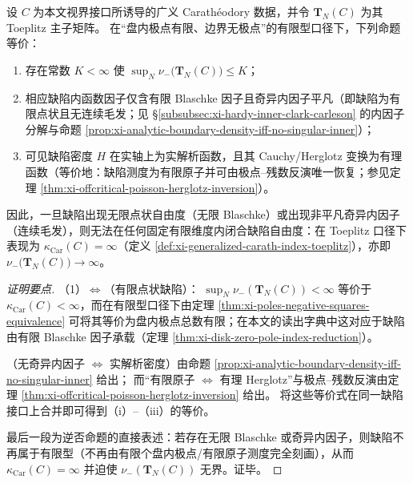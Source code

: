 \begin{corollary}\label{cor:xi-discrete-vs-continuous-hair-by-negative-inertia}
设 \(C\) 为本文视界接口所诱导的广义 Carath\'eodory 数据，并令 \(\mathbf{T}_N(C)\) 为其 Toeplitz 主子矩阵。
在“盘内极点有限、边界无极点”的有限型口径下，下列命题等价：
\begin{enumerate}
  \item 存在常数 \(K<\infty\) 使
  \(\sup_{N}\nu_-\!\bigl(\mathbf{T}_N(C)\bigr)\le K\)；
  \item 相应缺陷内函数因子仅含有限 Blaschke 因子且奇异内因子平凡（即缺陷为有限点状且无连续毛发；见 \S\ref{subsubsec:xi-hardy-inner-clark-carleson} 的内因子分解与命题 \ref{prop:xi-analytic-boundary-density-iff-no-singular-inner}）；
  \item 可见缺陷密度 \(H\) 在实轴上为实解析函数，且其 Cauchy/Herglotz 变换为有理函数（等价地：缺陷测度为有限原子并可由极点--残数反演唯一恢复；参见定理 \ref{thm:xi-offcritical-poisson-herglotz-inversion}）。
\end{enumerate}
因此，一旦缺陷出现无限点状自由度（无限 Blaschke）或出现非平凡奇异内因子（连续毛发），则无法在任何固定有限维度内闭合缺陷自由度：在 Toeplitz 口径下表现为 \(\kappa_{\mathrm{Car}}(C)=\infty\)（定义 \ref{def:xi-generalized-carath-index-toeplitz}），亦即 \(\nu_-\!\bigl(\mathbf{T}_N(C)\bigr)\to\infty\)。
\end{corollary}
\begin{proof}[证明要点]
（1）\(\Longleftrightarrow\)（有限点状缺陷）：
\(\sup_N\nu_-(\mathbf{T}_N(C))<\infty\) 等价于 \(\kappa_{\mathrm{Car}}(C)<\infty\)，而在有限型口径下由定理 \ref{thm:xi-poles-negative-squares-equivalence} 可将其等价为盘内极点总数有限；在本文的读出字典中这对应于缺陷由有限 Blaschke 因子承载（定理 \ref{thm:xi-disk-zero-pole-index-reduction}）。
\par
（无奇异内因子 \(\Longleftrightarrow\) 实解析密度）由命题 \ref{prop:xi-analytic-boundary-density-iff-no-singular-inner} 给出；
而“有限原子 \(\Longleftrightarrow\) 有理 Herglotz”与极点--残数反演由定理 \ref{thm:xi-offcritical-poisson-herglotz-inversion} 给出。
将这些等价式在同一缺陷接口上合并即可得到（i）--（iii）的等价。
\par
最后一段为逆否命题的直接表述：若存在无限 Blaschke 或奇异内因子，则缺陷不再属于有限型（不再由有限个盘内极点/有限原子测度完全刻画），从而 \(\kappa_{\mathrm{Car}}(C)=\infty\) 并迫使 \(\nu_-(\mathbf{T}_N(C))\) 无界。证毕。
\end{proof}

